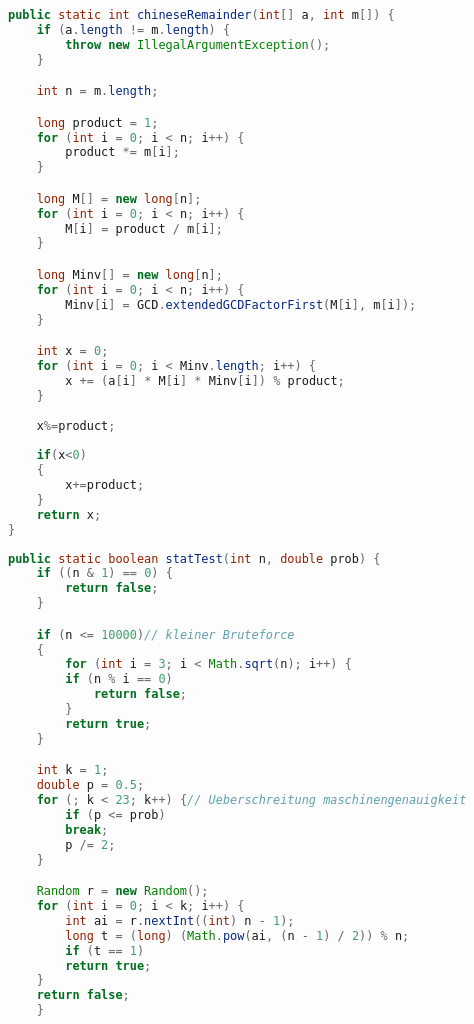 \documentclass[11pt,a4paper]{scrartcl}
\begin{document}
\begin{lstlisting}[language=Java,caption={GCD}]
 public static int chineseRemainder(int[] a, int m[]) {
	if (a.length != m.length) {
	    throw new IllegalArgumentException();
	}

	int n = m.length;

	long product = 1;
	for (int i = 0; i < n; i++) {
	    product *= m[i];
	}

	long M[] = new long[n];
	for (int i = 0; i < n; i++) {
	    M[i] = product / m[i];
	}

	long Minv[] = new long[n];
	for (int i = 0; i < n; i++) {
	    Minv[i] = GCD.extendedGCDFactorFirst(M[i], m[i]);
	}

	int x = 0;
	for (int i = 0; i < Minv.length; i++) {
	    x += (a[i] * M[i] * Minv[i]) % product;
	}
	
	x%=product;
	
	if(x<0)
	{
	    x+=product;
	}
	return x;
}
\end{lstlisting}

\begin{lstlisting}[language=Java,caption={statistischer Primzahlentest},label={lst:primtest}]
	public static boolean statTest(int n, double prob) {
	if ((n & 1) == 0) {
	    return false;
	}

	if (n <= 10000)// kleiner Bruteforce
	{
	    for (int i = 3; i < Math.sqrt(n); i++) {
		if (n % i == 0)
		    return false;
	    }
	    return true;
	}

	int k = 1;
	double p = 0.5;
	for (; k < 23; k++) {// Ueberschreitung maschinengenauigkeit
	    if (p <= prob)
		break;
	    p /= 2;
	}

	Random r = new Random();
	for (int i = 0; i < k; i++) {
	    int ai = r.nextInt((int) n - 1);
	    long t = (long) (Math.pow(ai, (n - 1) / 2)) % n;
	    if (t == 1)
		return true;
	}
	return false;
    }
\end{lstlisting}
\end{document}
